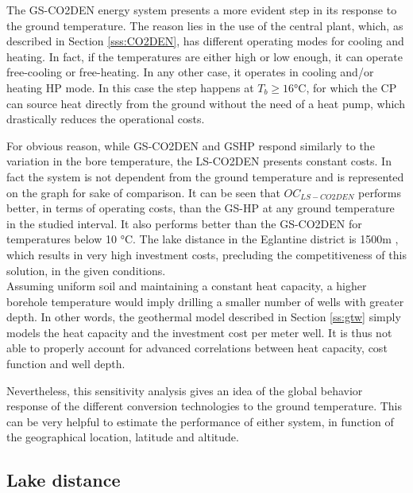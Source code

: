 \documentclass{article}
\begin{document}
The GS-CO2DEN energy system presents a more evident step in its response to the ground temperature. The reason lies in the use of the central plant, which, as described in Section \ref{sss:CO2DEN}, has different operating modes for cooling and heating. In fact, if the temperatures are either high or low enough, it can operate free-cooling or free-heating. In any other case, it operates in cooling and/or heating HP mode. In this case the step happens at $T_{b} \geq 16 \si{\celsius}$, for which the CP can source heat directly from the ground without the need of a heat pump, which drastically reduces the operational costs.

For obvious reason, while GS-CO2DEN and GSHP respond similarly to the variation in the bore temperature, the LS-CO2DEN presents constant costs. In fact the system is not dependent from the ground temperature and is represented on the graph for sake of comparison. It can be seen that $OC_{LS-CO2DEN}$ performs better, in terms of operating costs, than the GS-HP at any ground temperature in the studied interval. It also performs better than the GS-CO2DEN for temperatures below 10 \si{\celsius}. The lake distance in the Eglantine district is 1500m , which results in very high investment costs, precluding the competitiveness of this solution, in the given conditions.\\

Assuming uniform soil and maintaining a constant heat capacity, a higher borehole temperature would imply drilling a smaller number of wells with greater depth. In other words, the geothermal model described in Section \ref{ss:gtw} simply models the heat capacity and the investment cost per meter well. It is thus not able to properly account for advanced correlations between heat capacity, cost function and well depth.

Nevertheless, this sensitivity analysis gives an idea of the global behavior response of the different conversion technologies to the ground temperature. This can be very helpful to estimate the performance of either system, in function of the geographical location, latitude and altitude.


\subsection{Lake distance}
\end{document}
